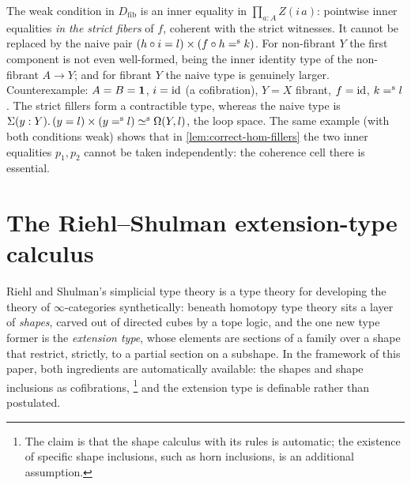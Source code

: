 \begin{longversion}
\begin{remark}\label{rem:fibred-warning}
	The weak condition in $D_{\mathrm{fib}}$ is an inner equality in $\prod_{a:A} Z(i\,a)$:
	pointwise inner equalities \emph{in the strict fibers} of $f$, coherent with the strict
	witnesses. It cannot be replaced by the naive pair
	$(h \circ i = l) \times (f \circ h \mathrel{=^\textup{s}} k)$. For non-fibrant $Y$ the first
	component is not even well-formed, being the inner identity type of the
	non-fibrant $A \to Y$; and for fibrant $Y$ the naive type is genuinely larger.
	Counterexample: $A = B = \mathbf{1}$, $i = \operatorname{id}$ (a cofibration), $Y = X$ fibrant,
	$f = \operatorname{id}$, $k \mathrel{=^\textup{s}} l$. The strict fillers form a contractible type, whereas
	the naive type is $\Sigma(y:Y).\,(y = l) \times (y \mathrel{=^\textup{s}} l) \mathrel{\simeq^\textup{s}} \Omega(Y,l)$,
	the loop space. The same example (with both conditions weak) shows that in
	\cref{lem:correct-hom-fillers} the two inner equalities $p_1,p_2$ cannot be taken
	independently: the coherence cell there is essential.
\end{remark}
\end{longversion}



\section{The Riehl--Shulman extension-type calculus}
\label{sec:rs-calculus}

Riehl and Shulman's simplicial type theory \citep{RS2017} is a type theory for
developing the theory of $\infty$-categories synthetically: beneath homotopy
type theory sits a layer of \emph{shapes}, carved out of directed cubes by a
tope logic, and the one new type former is the \emph{extension type}, whose
elements are sections of a family over a shape that restrict, strictly, to
a partial section on a subshape.
In the framework of this paper,
both ingredients are automatically available: the shapes and shape inclusions as
cofibrations,%
\footnote{The claim is that the shape calculus with its rules is automatic; the existence of specific shape inclusions, such as horn inclusions, is an additional assumption.}
and the extension type is definable rather than postulated.


